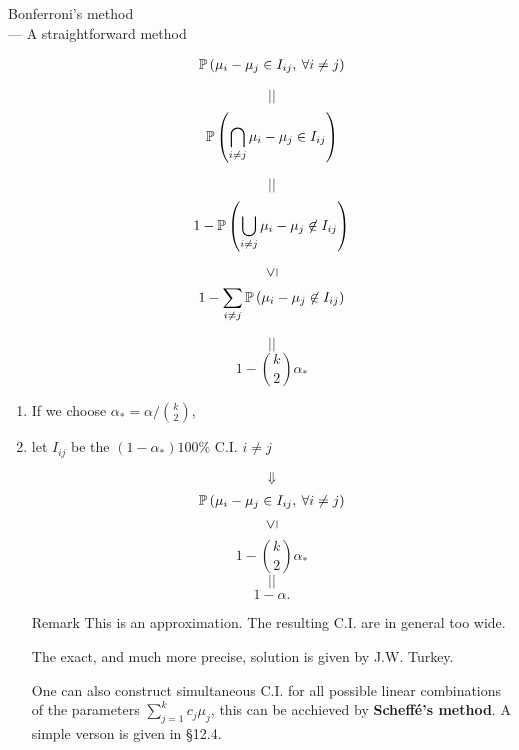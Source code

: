 \begin{frame}[fragile]{Bonferroni's method \\
		\small --- A straightforward method}
		\begin{minipage}{0.4\textwidth}
	\begin{enumerate}
		\item[]
			\begin{align*}
				\mathbb{P}\left(\mu_i-\mu_j\in I_{ij},\: \forall i\ne j\right)
			\end{align*}
		\item[]
			\[||\]
			\[
			\mathbb{P}\left(\bigcap_{i\ne j}\mu_i-\mu_j\in I_{ij}\right)
			\]
		\item[]
			\[||\]
			\[
				1-\mathbb{P}\left(\bigcup_{i\ne j}\mu_i-\mu_j\not\in I_{ij}\right)
			\]
		\item[]
			\[\text{\rotatebox[origin=c]{90}{$\le$}}\]
			\[
				1-\sum_{i\ne j} \mathbb{P}\left(\mu_i-\mu_j\not\in I_{ij}\right)
			\]
		\item[]
			\[||\]
			\[
				1 - {k\choose 2} \alpha_*
			\]
	\end{enumerate}
		\end{minipage}
		\hfill\pause
		\begin{minipage}{0.55\textwidth}
			\begin{enumerate}
				\item
			 If we choose $\alpha_* = \alpha/{k\choose 2}$,
		 \item let $I_{ij}$ be the $(1-\alpha_*)100\%$ C.I. $i\ne j$
		 \item[]
			 \[\Downarrow\]
			\begin{align*}
				\mathbb{P}\left(\mu_i-\mu_j\in I_{ij},\: \forall i\ne j\right)
			\end{align*}
			\[\text{\rotatebox[origin=c]{90}{$\le$}}\]
			\[
				1 - {k\choose 2} \alpha_*
			\]
			\[||\]
			\[
			1-\alpha.
			\]
			\end{enumerate}
		\end{minipage}
\end{frame}
\begin{frame}[fragile]

	\begin{enumerate}
\item[Remark] This is an approximation. The resulting C.I. are in general too wide.\\[1em]
\item[] The exact, and much more precise, solution is given by J.W. Turkey.\\[1em]
\item[] One can also construct simultaneous C.I. for all possible linear combinations of the parameters $\sum_{j=1}^k c_j \mu_j$, this can be acchieved by {\bf Scheff\'e's method}. A simple verson is given in \S 12.4.
	\end{enumerate}
\end{frame}

